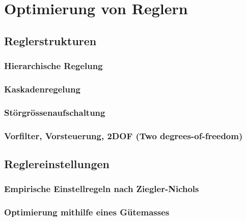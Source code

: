 \section{Optimierung von Reglern}

\subsection{Reglerstrukturen}

\subsubsection{Hierarchische Regelung}

\subsubsection{Kaskadenregelung}

\subsubsection{Störgrössenaufschaltung}


\subsubsection{Vorfilter, Vorsteuerung, 2DOF (Two degrees-of-freedom)}


\subsection{Reglereinstellungen}

\subsubsection{Empirische Einstellregeln nach Ziegler-Nichols}

\subsubsection{Optimierung mithilfe eines Gütemasses}